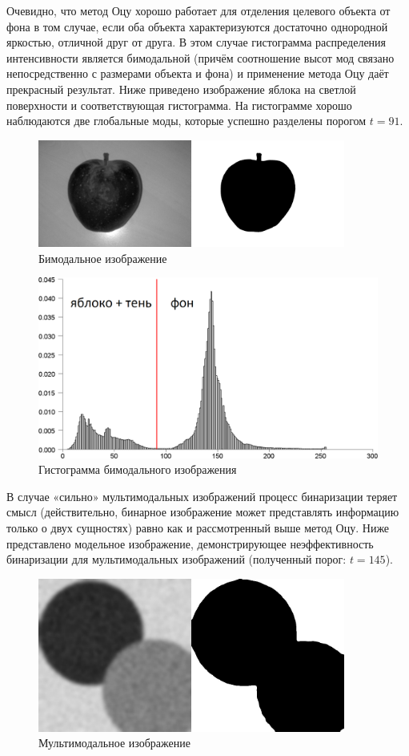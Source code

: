 \documentclass[12pt,a4paper]{extarticle} %
\begin{document}
Очевидно, что метод Оцу хорошо работает для отделения целевого объекта от фона в том случае, если оба объекта характеризуются достаточно однородной яркостью, отличной друг от друга. В этом случае гистограмма распределения интенсивности является бимодальной (причём соотношение высот мод связано непосредственно с размерами объекта и фона) и применение метода Оцу даёт прекрасный результат. Ниже приведено изображение яблока на светлой поверхности и соответствующая гистограмма. На гистограмме хорошо наблюдаются две глобальные моды, которые успешно разделены порогом $t=91$.
\vfill
\begin{figure}[h]
 \centering
    \includegraphics[width=0.9\textwidth]{images/apple.png}
	\caption{Бимодальное изображение}
\end{figure}
\vfill
\begin{figure}[h]
 \centering
    \includegraphics[width=.9\textwidth]{images/gist1.png}
\caption{Гистограмма бимодального изображения}
\end{figure}
\vfill
\newpage
В случае «сильно» мультимодальных изображений процесс бинаризации теряет смысл (действительно, бинарное изображение может представлять информацию только о двух сущностях) равно как и рассмотренный выше метод Оцу. Ниже представлено модельное изображение, демонстрирующее неэффективность бинаризации для мультимодальных изображений (полученный порог: $t=145$).
\vfill
\begin{figure}[h]
 \centering
    \includegraphics[width=0.9\textwidth]{images/mastercard.png}
	\caption{Мультимодальное изображение}
\end{figure}
\end{document}
